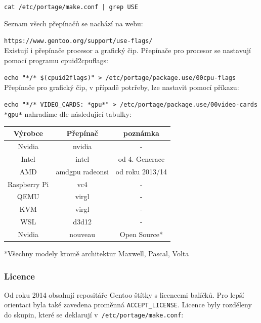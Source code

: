 \documentclass[12pt,a4paper,twoside,]{article}
\begin{document}
{\texttt{cat /etc/portage/make.conf | grep USE}

\hspace*{-1.5em}Seznam všech přepínačů se nachází na webu:

\texttt{https://www.gentoo.org/support/use-flags/}\\

\hspace*{-1.5em}Existují i přepínače procesor a grafický čip. Přepínače pro procesor se nastavují pomocí programu cpuid2cpuflags:


\texttt{echo "*/* \$(cpuid2flags)" > /etc/portage/package.use/00cpu-flags}\\

\hspace*{-1.5em}Přepínače pro grafický čip, v případě potrřeby, lze nastavit pomocí příkazu:

\texttt{echo "*/* VIDEO\_CARDS: *gpu*" > /etc/portage/package.use/00video-cards}\\

\hspace*{-1.5em}\texttt{*gpu*} nahradíme dle následující tabulky:

\begin{table}[h]
	\centering
	\begin{tabular}{|c|c|c|}
		\hline
		Výrobce & Přepínač & poznámka \\
		\hline
		Nvidia & nvidia & -\\
		\hline
		Intel & intel & od 4. Generace \\
		\hline
		AMD & amdgpu radeonsi & od roku 2013/14 \\
		\hline
		Raspberry Pi & vc4 & - \\
		\hline
		QEMU&virgl&-\\
		\hline
		KVM&virgl&-\\
		\hline
		WSL&d3d12&- \\
		\hline
		Nvidia & nouveau & Open Source*\\
		\hline
		
	\end{tabular}
\end{table}
*Všechny modely kromě architektur Maxwell, Pascal, Volta
\newpage
\subsubsection{Licence}
Od roku 2014 obsahují repositáře Gentoo štítky s licencemi balíčků. Pro lepší orientaci byla také zavedena proměnná \texttt{ACCEPT\_LICENSE}. Licence byly rozděleny do skupin, které se deklarují v~\texttt{/etc/portage/make.conf}:

}
\end{document}
